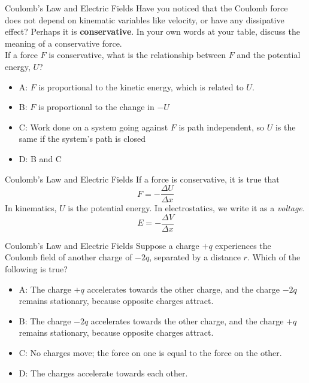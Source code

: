 \documentclass{beamer}
\begin{document}
\begin{frame}{Coulomb’s Law and Electric Fields}
Have you noticed that the Coulomb force does not depend on kinematic variables like velocity, or have any dissipative effect?  Perhaps it is \alert{\textbf{conservative}}.  In your own words at your table, discuss the meaning of a conservative force. \\ \vspace{0.5cm}
\small
If a force $F$ is conservative, what is the relationship between $F$ and the potential energy, $U$?
\begin{itemize}
\item A: $F$ is proportional to the kinetic energy, which is related to $U$.
\item B: $F$ is proportional to the change in $-U$
\item C: Work done on a system going against $F$ is path independent, so $U$ is the same if the system's path is closed
\item D: B and C
\end{itemize}
\end{frame}

\begin{frame}{Coulomb’s Law and Electric Fields}
If a force is conservative, it is true that
\begin{equation}
F = -\frac{\Delta U}{\Delta x}
\end{equation}
In kinematics, $U$ is the potential energy.  In electrostatics, we write it as a \textit{voltage.}
\begin{equation}
E = -\frac{\Delta V}{\Delta x}
\end{equation}
\end{frame}

\begin{frame}{Coulomb’s Law and Electric Fields}
Suppose a charge $+q$ experiences the Coulomb field of another charge of $-2q$, separated by a distance $r$.  Which of the following is true?
\begin{itemize}
\item A: The charge $+q$ accelerates towards the other charge, and the charge $-2q$ remains stationary, because opposite charges attract.
\item B: The charge $-2q$ accelerates towards the other charge, and the charge $+q$ remains stationary, because opposite charges attract.
\item C: No charges move; the force on one is equal to the force on the other.
\item D: The charges accelerate towards each other.
\end{itemize}
\end{frame}
\end{document}
